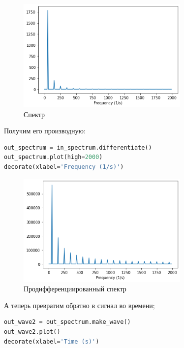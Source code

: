 \documentclass[a4paper,12pt]{report}
\begin{document}
    \begin{figure}[H]
        \centering
        \includegraphics[width=0.75\textwidth]{ex1_in_spectrum.png}
        \caption{Спектр}
        \label{fig:ex1_in_spectrum}
    \end{figure}

    Получим его производную:
    
\begin{lstlisting}[language=Python,caption=Продифференциированный спектр]
out_spectrum = in_spectrum.differentiate()
out_spectrum.plot(high=2000)
decorate(xlabel='Frequency (1/s)')
\end{lstlisting}

    \begin{figure}[H]
        \centering
        \includegraphics[width=0.75\textwidth]{ex1_out_spectrum.png}
        \caption{Продифференциированный спектр}
        \label{fig:ex1_out_spectrum}
    \end{figure}

    А теперь превратим обратно в сигнал во времени;
    
\begin{lstlisting}[language=Python,caption=Новый сигнал]
out_wave2 = out_spectrum.make_wave()
out_wave2.plot()
decorate(xlabel='Time (s)')
\end{lstlisting}
\end{document}
